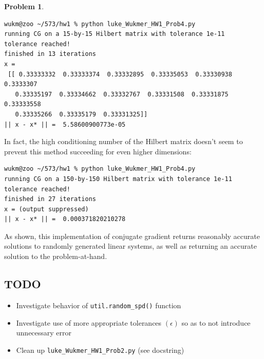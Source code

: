 \documentclass[10pt]{article}
\theoremstyle{plain}
\theoremstyle{definition}
\newtheorem{prob}{Problem}
\numberwithin{equation}{section}
\begin{document}
\begin{prob}
\begin{verbatim}
wukm@zoo ~/573/hw1 % python luke_Wukmer_HW1_Prob4.py
running CG on a 15-by-15 Hilbert matrix with tolerance 1e-11
tolerance reached!
finished in 13 iterations
x =
 [[ 0.33333332  0.33333374  0.33332895  0.33335053  0.33330938  0.3333307
   0.33335197  0.33334662  0.33332767  0.33331508  0.33331875  0.33333558
   0.33335266  0.33335179  0.33331325]]
|| x - x* || =  5.58600900773e-05
\end{verbatim}

In fact, the high conditioning number of the Hilbert matrix doesn't seem to prevent this method succeeding for even higher dimensions:

\begin{verbatim}
wukm@zoo ~/573/hw1 % python luke_Wukmer_HW1_Prob4.py
running CG on a 150-by-150 Hilbert matrix with tolerance 1e-11
tolerance reached!
finished in 27 iterations
x = (output suppressed)
|| x - x* || =  0.000371820210278
\end{verbatim}

As shown, this implementation of conjugate gradient returns reasonably accurate
solutions to randomly generated linear systems, as well as returning an accurate solution
to the problem-at-hand.
\end{prob}
\hrulefill

\subsection*{\textsc{TODO}}
  \begin{itemize}
    \item Investigate behavior of \texttt{util.random\_spd()} function
    \item Investigate use of more appropriate tolerances $(\epsilon)$ so as to
          not introduce unnecessary error
    \item Clean up \texttt{luke\_Wukmer\_HW1\_Prob2.py} (see docstring)
  \end{itemize}
\end{document}
